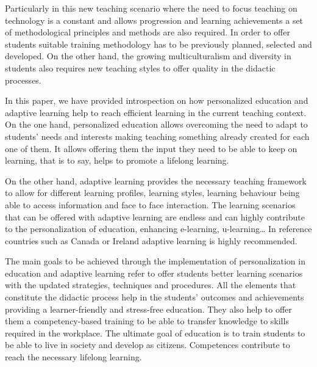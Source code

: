 \documentclass[english]{textolivre}
\begin{document}
Particularly in this new teaching scenario where the need to focus teaching on technology is a constant and allows progression and learning achievements a set of methodological principles and methods are also required. In order to offer students suitable training methodology has to be previously planned, selected and developed. On the other hand, the growing multiculturalism and diversity in students also requires new teaching styles to offer quality in the didactic processes.

In this paper, we have provided introspection on how personalized education and adaptive learning help to reach efficient learning in the current teaching context. On the one hand, personalized education allows overcoming the need to adapt to students’ needs and interests making teaching something already created for each one of them. It allows offering them the input they need to be able to keep on learning, that is to say, helps to promote a lifelong learning.

On the other hand, adaptive learning provides the necessary teaching framework to allow for different learning profiles, learning styles, learning behaviour being able to access information and face to face interaction. The learning scenarios that can be offered with adaptive learning are endless and can highly contribute to the personalization of education, enhancing e-learning, u-learning… In reference countries such as Canada or Ireland adaptive learning is highly recommended.

The main goals to be achieved through the implementation of personalization in education and adaptive learning refer to offer students better learning scenarios with the updated strategies, techniques and procedures. All the elements that constitute the didactic process help in the students’ outcomes and achievements providing a learner-friendly and stress-free education. They also help to offer them a competency-based training to be able to transfer knowledge to skills required in the workplace. The ultimate goal of education is to train students to be able to live in society and develop as citizens. Competences contribute to reach the necessary lifelong learning.


\printbibliography\label{sec-bib}
\end{document}
